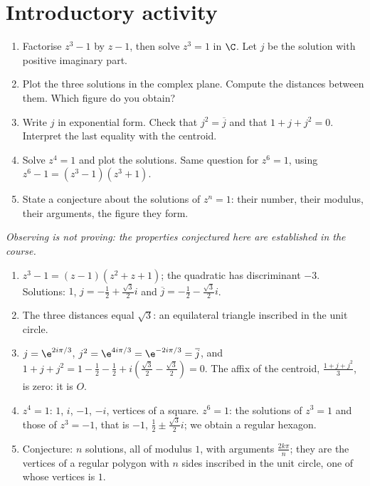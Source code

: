 \section{Introductory activity}
\begin{activity}[The solutions of $z^n=1$ \mxchip{40 min}]
\begin{enumerate}
\item Factorise $z^3-1$ by $z-1$, then solve $z^3=1$ in $\C$. Let $j$ be the solution with positive imaginary part.
\item Plot the three solutions in the complex plane. Compute the distances between them. Which figure do you obtain?
\item Write $j$ in exponential form. Check that $j^2=\overline j$ and that $1+j+j^2=0$. Interpret the last equality with the centroid.
\item Solve $z^4=1$ and plot the solutions. Same question for $z^6=1$, using $z^6-1=\left(z^3-1\right)\left(z^3+1\right)$.
\item State a conjecture about the solutions of $z^n=1$: their number, their modulus, their arguments, the figure they form.
\end{enumerate}
\par\emph{Observing is not proving: the properties conjectured here are established in the course.}
\end{activity}
\begin{solution}[Activity]
\begin{enumerate}
\item $z^3-1=(z-1)\left(z^2+z+1\right)$; the quadratic has discriminant $-3$. Solutions: $1$, $j=-\frac12+\frac{\sqrt3}2i$ and $\overline j=-\frac12-\frac{\sqrt3}2i$.
\item The three distances equal $\sqrt3$: an equilateral triangle inscribed in the unit circle.
\item $j=\e^{2i\pi/3}$, $j^2=\e^{4i\pi/3}=\e^{-2i\pi/3}=\overline j$, and $1+j+j^2=1-\frac12-\frac12+i\left(\frac{\sqrt3}2-\frac{\sqrt3}2\right)=0$. The affix of the centroid, $\frac{1+j+j^2}3$, is zero: it is $O$.
\item $z^4=1$: $1$, $i$, $-1$, $-i$, vertices of a square. $z^6=1$: the solutions of $z^3=1$ and those of $z^3=-1$, that is $-1$, $\frac12\pm\frac{\sqrt3}2i$; we obtain a regular hexagon.
\item Conjecture: $n$ solutions, all of modulus $1$, with arguments $\frac{2k\pi}n$; they are the vertices of a regular polygon with $n$ sides inscribed in the unit circle, one of whose vertices is $1$.
\end{enumerate}
\end{solution}

